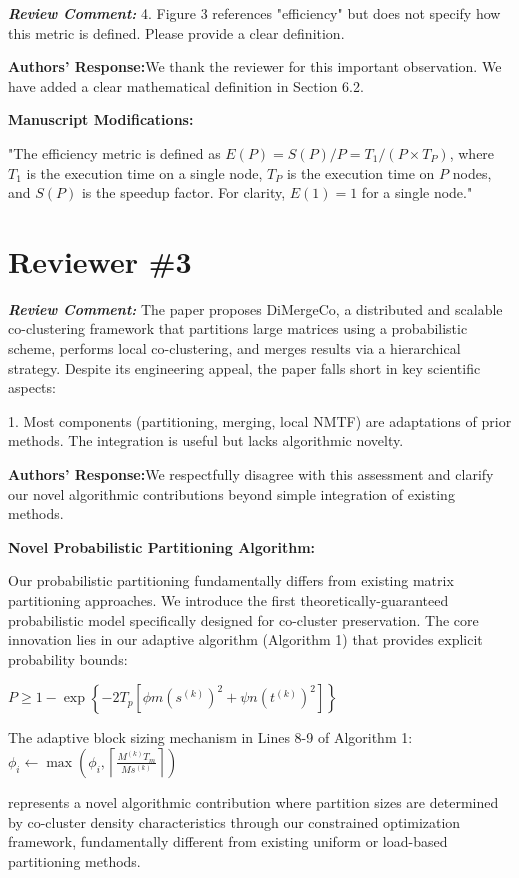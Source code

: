 \documentclass{ar2rc}
\renewcommand{\RC}[1]{\textbf{\textit{Review Comment:}} #1}
\renewcommand{\AR}{\textbf{Authors' Response:}}
\begin{document}
\RC{4. Figure 3 references "efficiency" but does not specify how this metric is defined. Please provide a clear definition.}

\AR We thank the reviewer for this important observation. We have added a clear mathematical definition in Section 6.2.

\textbf{Manuscript Modifications:}

"The efficiency metric is defined as $E(P) = S(P)/P = T_1/(P \times T_P)$, where $T_1$ is the execution time on a single node, $T_P$ is the execution time on $P$ nodes, and $S(P)$ is the speedup factor. For clarity, $E(1) = 1$ for a single node."


\section{Reviewer \#3}

\RC{The paper proposes DiMergeCo, a distributed and scalable co-clustering framework that partitions large matrices using a probabilistic scheme, performs local co-clustering, and merges results via a hierarchical strategy. Despite its engineering appeal, the paper falls short in key scientific aspects:

  1. Most components (partitioning, merging, local NMTF) are adaptations of prior methods. The integration is useful but lacks algorithmic novelty.}

\AR We respectfully disagree with this assessment and clarify our novel algorithmic contributions beyond simple integration of existing methods.

\textbf{Novel Probabilistic Partitioning Algorithm:}

Our probabilistic partitioning fundamentally differs from existing matrix partitioning approaches. We introduce the first theoretically-guaranteed probabilistic model specifically designed for co-cluster preservation. The core innovation lies in our adaptive algorithm (Algorithm 1) that provides explicit probability bounds:

$P \geq 1 - \exp\left\{-2T_p\left[\phi m (s^{(k)})^2 + \psi n (t^{(k)})^2\right]\right\}$

The adaptive block sizing mechanism in Lines 8-9 of Algorithm 1:
$\phi_i \leftarrow \max\left(\phi_i, \left\lceil\frac{M^{(k)}T_m}{Ms^{(k)}}\right\rceil\right)$

represents a novel algorithmic contribution where partition sizes are determined by co-cluster density characteristics through our constrained optimization framework, fundamentally different from existing uniform or load-based partitioning methods.
\end{document}
